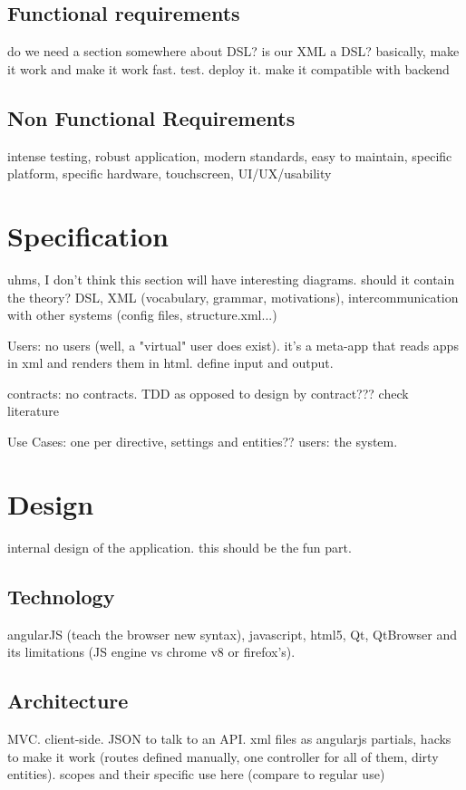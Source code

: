 \section{Functional requirements}
do we need a section somewhere about DSL? is our XML a DSL?
basically, make it work and make it work fast. test. deploy it. make it compatible with backend

\section{Non Functional Requirements}
intense testing, robust application, modern standards, easy to maintain, specific platform, specific hardware, touchscreen, UI/UX/usability

\chapter{Specification}
uhms, I don't think this section will have interesting diagrams.
should it contain the theory? DSL, XML (vocabulary, grammar, motivations), intercommunication with other systems (config files, structure.xml...)

Users: no users (well, a "virtual" user does exist). it's a meta-app that reads apps in xml and renders them in html. define input and output.

contracts: no contracts. TDD as opposed to design by contract??? check literature

Use Cases: one per directive, settings and entities?? users: the system.

\chapter{Design}
internal design of the application. this should be the fun part.
\section{Technology}
angularJS (teach the browser new syntax), javascript, html5, Qt, QtBrowser and its limitations (JS engine vs chrome v8 or firefox's).

\section{Architecture}
MVC. client-side. JSON to talk to an API. xml files as angularjs partials, hacks to make it work (routes defined manually, one controller for all of them, dirty entities). scopes and their specific use here (compare to regular use)


